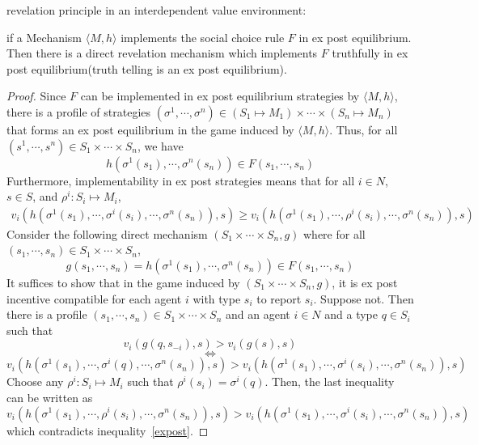 \begin{prop*}
revelation principle in an interdependent value environment:

if a Mechanism $\langle M, h\rangle$ implements the social choice rule $F$ in ex post 
equilibrium. Then there is a direct revelation mechanism which implements $F$ truthfully in ex post equilibrium(truth telling is an ex
post equilibrium). 

\end{prop*}
\begin{proof}
 Since $F$ can be implemented in ex post equilibrium strategies by  $\langle M, h\rangle$, there is a profile of strategies $(\sigma^1,\cdots,
 \sigma^n)\in (S_1\mapsto M_1)\times \cdots\times (S_n\mapsto M_n)$ that forms an ex post equilibrium in the game induced by $\langle M, h\rangle$. Thus, for
 all $(s^1, \cdots,s^n)\in S_1\times \cdots\times S_n$, we have
 $$h(\sigma^1(s_1),\cdots,\sigma^n(s_n))\in F(s_1,\cdots,s_n)$$
 Furthermore, implementability in ex post strategies means that for all $i\in N$, $s\in S$, and $\rho^i:S_i\mapsto M_i$,
 \begin{align}\label{expost}
 v_i(h(\sigma^1(s_1),\cdots,\sigma^i(s_i),\cdots,\sigma^n(s_n)),s)\geqslant v_i(h(\sigma^1(s_1),\cdots,\rho^i(s_i),\cdots,\sigma^n(s_n)),s)
 \end{align}
Consider the following direct mechanism $(S_1\times\cdots\times S_n, g)$ where for all $(s_1,\cdots,s_n)\in S_1\times\cdots\times S_n$,
$$g(s_1,\cdots,s_n)=h(\sigma^1(s_1),\cdots,\sigma^n(s_n))\in F(s_1,\cdots,s_n)$$
It suffices to show that in the game induced by $(S_1\times\cdots\times S_n, g)$, it is ex post incentive compatible for each agent 
$i$ with type $s_i$ to report $s_i$. Suppose not. Then there is a profile $(s_1,\cdots,s_n)\in S_1\times\cdots\times S_n$ and an
agent $i\in N$ and a type $q\in S_i$ such that
$$v_i(g(q,s_{-i}),s)>v_i(g(s),s)$$
$$\Longleftrightarrow$$
$$v_i(h(\sigma^1(s_1),\cdots,\sigma^i(q),\cdots,\sigma^n(s_n)),s)>v_i(h(\sigma^1(s_1),\cdots,\sigma^i(s_i),\cdots,\sigma^n(s_n)),s)$$
Choose any $\rho^i:S_i\mapsto M_i$ such that $\rho^i(s_i)=\sigma^i(q)$. Then, the last inequality can be written as
$$v_i(h(\sigma^1(s_1),\cdots,\rho^i(s_i),\cdots,\sigma^n(s_n)),s)>v_i(h(\sigma^1(s_1),\cdots,\sigma^i(s_i),\cdots,\sigma^n(s_n)),s)$$
which contradicts inequality~\ref{expost}.
 \end{proof}
